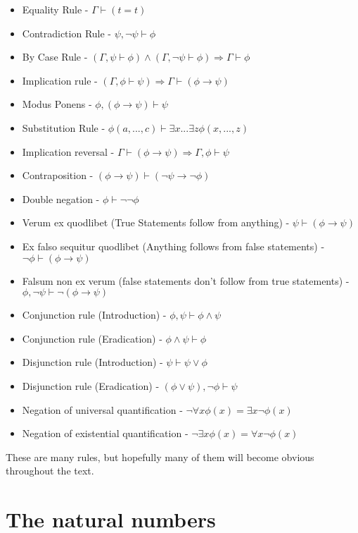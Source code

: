 \documentclass[]{scrbook}
\begin{document}
\begin{itemize}
	\item[] Equality Rule - $\Gamma\vdash (t=t)$
	\item[] Contradiction Rule - $\psi, \neg\psi \vdash \phi$
	\item[] By Case Rule - $(\Gamma,\psi\vdash\phi)\wedge(\Gamma,\neg\psi\vdash\phi) \Rightarrow \Gamma\vdash\phi$
	\item[] Implication rule - $(\Gamma,\phi\vdash\psi)\Rightarrow\Gamma\vdash(\phi\rightarrow\psi)$
	\item[] Modus Ponens - $\phi, (\phi\rightarrow\psi) \vdash \psi$
	\item[] Substitution Rule - $\phi(a,...,c) \vdash \exists x ... \exists z \phi(x,...,z)$
	\item[] Implication reversal - $\Gamma\vdash(\phi\rightarrow\psi) \Rightarrow \Gamma,\phi\vdash\psi$
	\item[] Contraposition - $(\phi\rightarrow\psi)\vdash(\neg\psi\rightarrow\neg\phi)$
	\item[] Double negation - $\phi\vdash\neg\neg\phi$
	\item[] Verum ex quodlibet (True Statements follow from anything) - $\psi \vdash (\phi\rightarrow\psi)$
	\item[] Ex falso sequitur quodlibet (Anything follows from false statements) - $\neg\phi\vdash(\phi\rightarrow\psi)$
	\item[] Falsum non ex verum (false statements don't follow from true statements) - $\phi,\neg\psi\vdash\neg(\phi\rightarrow\psi)$
	\item[] Conjunction rule (Introduction) - $\phi,\psi\vdash\phi\wedge\psi$
	\item[] Conjunction rule (Eradication) - $\phi\wedge\psi\vdash\phi$
	\item[] Disjunction rule (Introduction) - $\psi\vdash\psi\vee\phi$
	\item[] Disjunction rule (Eradication) - $(\phi\vee\psi),\neg\phi \vdash \psi$
	\item[] Negation of universal quantification - $\neg\forall x\phi(x) = \exists x\neg\phi(x)$
	\item[] Negation of existential quantification - $\neg\exists x\phi(x) = \forall x\neg\phi(x)$
\end{itemize}

These are many rules, but hopefully many of them will become obvious throughout the text.



\chapter{The natural numbers}
\end{document}
